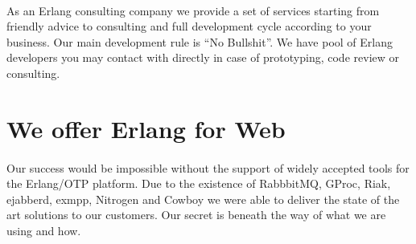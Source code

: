\documentclass[11pt]{article}
\begin{document}
\paragraph{}
As an Erlang consulting company we provide a set of services starting from friendly advice to
consulting and full development cycle according to your business.
Our main development rule is ``No Bullshit''.
We have pool of Erlang developers you may contact with directly in case of
prototyping, code review or consulting.



\section*{We offer Erlang for Web}
\paragraph{}
Our success would be impossible without the support of widely accepted tools for the Erlang/OTP platform.
Due to the existence of RabbbitMQ, GProc, Riak, ejabberd, exmpp, Nitrogen and
Cowboy we were able to deliver the state of the art solutions to our customers.
Our secret is beneath the way of what we are using and how.



\end{document}
